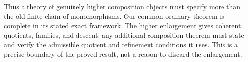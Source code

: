 Thus a theory of genuinely higher composition objects must specify more
than the old finite chain of monomorphisms.  Our common ordinary theorem
is complete in its stated exact framework.  The higher enlargement gives
coherent quotients, families, and descent; any additional composition
theorem must state and verify the admissible quotient and refinement
conditions it uses.  This is a precise boundary of the proved result,
not a reason to discard the enlargement.
